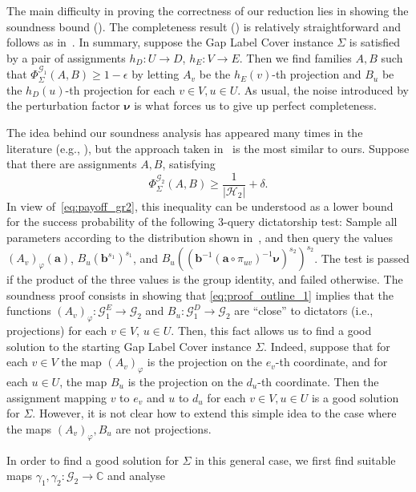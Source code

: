 \documentclass[a4paper,11pt]{article}
\theoremstyle{definition}
\newcommand{\tuple}[1]{{\mathbf{#1}}}
\newcommand{\cc}{\mathbb{C}}
\newcommand{\gr}{\mathscr{G}}
\newcommand{\sgr}{\mathscr{H}}
\begin{document}
The main difficulty in proving the correctness of our reduction lies in showing the soundness bound (). The completeness result () is relatively straightforward and follows as in~\cite{EHR04:tcs}. In summary, suppose the Gap Label Cover instance $\Sigma$ is satisfied by a pair of assignments $h_D: U \rightarrow D$, 
$h_E: V\rightarrow E$. Then we find families $A,B$ such that $\Phi^{\gr_1}_\Sigma(A, B)\geq 1 - \epsilon$ by letting $A_v$ be the $h_E(v)$-th projection and $B_u$
be the $h_D(u)$-th projection for each $v\in V, u\in U$. As usual, the noise introduced by the perturbation factor $\bm{\nu}$ is what forces us to give up perfect completeness.\par
%
The idea behind our soundness analysis has appeared many times in the literature (e.g., \cite{Hastad01:jacm,EHR04:tcs,Bhangale21:stoc}), but the approach taken in~\cite{EHR04:tcs} is the most similar to ours. 
Suppose that there are assignments $A, B$, satisfying 
\begin{equation}
\label{eq:proof_outline_1}
\Phi_\Sigma^{\gr_2}(A, B)\geq 
\frac{1}{|\sgr_2|} + \delta.
\end{equation}
In view of~\eqref{eq:payoff_gr2}, this inequality
can be understood as a lower bound for the success probability of the following $3$-query dictatorship test: Sample all parameters
according to the distribution shown in~, and then
query the values $(A_v)_\varphi(\tuple{a})$, $B_u(\tuple{b}^{s_1})^{s_1}$, and
$B_u((\tuple{b}^{-1} (\tuple{a} \circ \pi_{uv})^{-1}\bm{\nu})^{s_2})^{s_2}$. The test
is passed if the product of the three values is the group identity, and failed
otherwise. 
%
The soundness proof consists in showing that \eqref{eq:proof_outline_1}
implies that the functions $(A_v)_{\varphi}: \gr_1^E \rightarrow \gr_2$ 
and $B_u: \gr_1^D \rightarrow \gr_2$ are ``close'' to dictators (i.e.,
projections) for each $v\in V$, $u\in U$. Then, this fact allows us to find a
good solution to the starting Gap Label Cover instance $\Sigma$. Indeed, suppose that for each $v\in V$ the map $(A_v)_{\varphi}$
is the projection on the $e_v$-th coordinate, and for each $u\in U$, the map $B_u$ is the projection on the $d_u$-th coordinate. Then the assignment mapping $v$ to $e_v$ and $u$ to $d_u$ for each $v\in V, u\in U$ is a good solution for $\Sigma$. However, it is not clear how to extend this simple idea to the case where the maps $(A_v)_\varphi, B_u$ are not projections. \par
In order to find a good solution for $\Sigma$ in this general case, we first find suitable maps $\gamma_1, \gamma_2:\gr_2 \rightarrow \cc$ and analyse 
\end{document}
